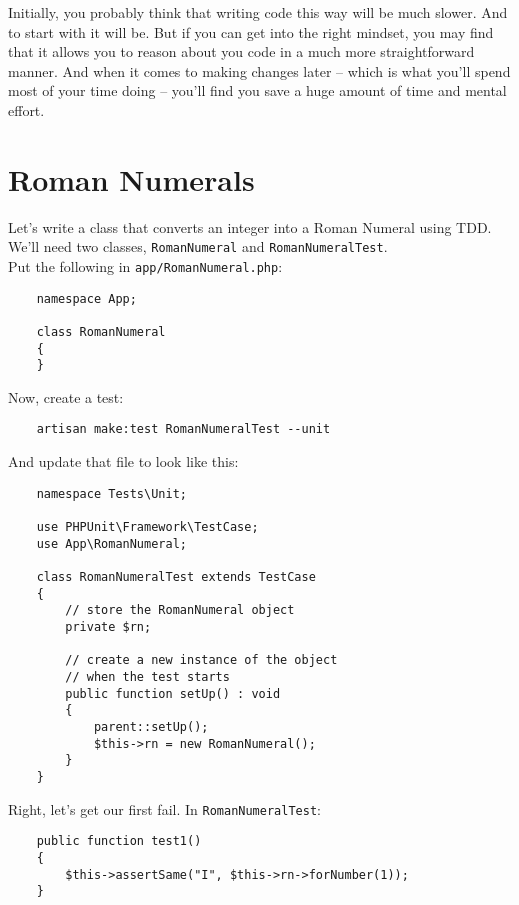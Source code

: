 Initially, you probably think that writing code this way will be much slower. And to start with it will be. But if you can get into the right mindset, you may find that it allows you to reason about you code in a much more straightforward manner. And when it comes to making changes later – which is what you'll spend most of your time doing – you'll find you save a huge amount of time and mental effort.

\section{Roman Numerals}

Let's write a class that converts an integer into a Roman Numeral using TDD.
\\

We'll need two classes, \texttt{RomanNumeral} and \texttt{RomanNumeralTest}.
\\

Put the following in \texttt{app/RomanNumeral.php}:

\begin{verbatim}
    namespace App;

    class RomanNumeral
    {
    }
\end{verbatim}

Now, create a test:

\begin{verbatim}
    artisan make:test RomanNumeralTest --unit
\end{verbatim}

And update that file to look like this:

\begin{verbatim}
    namespace Tests\Unit;

    use PHPUnit\Framework\TestCase;
    use App\RomanNumeral;

    class RomanNumeralTest extends TestCase
    {
        // store the RomanNumeral object
        private $rn;

        // create a new instance of the object
        // when the test starts
        public function setUp() : void
        {
            parent::setUp();
            $this->rn = new RomanNumeral();
        }
    }
\end{verbatim}

Right, let's get our first fail. In \texttt{RomanNumeralTest}:

\begin{verbatim}
    public function test1()
    {
        $this->assertSame("I", $this->rn->forNumber(1));
    }
\end{verbatim}

